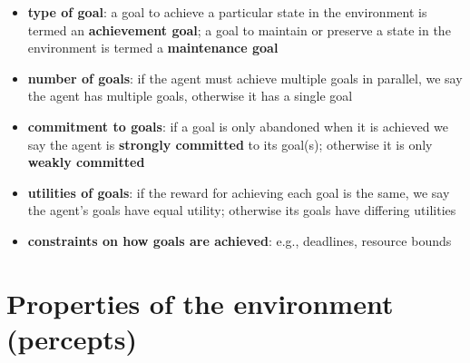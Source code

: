 \documentclass{article}
\begin{document}
\begin{itemize}
  \item \textbf{type of goal}: a goal to achieve a particular state in the environment is termed an \textbf{achievement goal}; a goal to maintain or preserve a state in the environment is termed a \textbf{maintenance goal} 
  \item \textbf{number of goals}: if the agent must achieve multiple goals in parallel, we say the agent has multiple goals, otherwise it has a single goal 
  \item \textbf{commitment to goals}: if a goal is only abandoned when it is achieved we say the agent is \textbf{strongly committed} to its goal(s); otherwise it is only \textbf{weakly committed }
  \item \textbf{utilities of goals}: if the reward for achieving each goal is the same, we say the agent’s goals have equal utility; otherwise its goals have differing utilities 
  \item \textbf{constraints on how goals are achieved}: e.g., deadlines, resource bounds
\end{itemize}

\section{Properties of the environment (percepts)}
\end{document}
